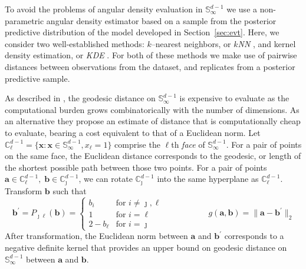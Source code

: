 To avoid the problems of angular density evaluation in $\mathbb{S}_\infty^{d-1}$ we use a 
    non-parametric angular density estimator based on a sample from the 
    posterior predictive distribution of the model developed in 
    Section~\ref{sec:evt}. Here, we consider two well-established
    methods: $k$--nearest neighbors, or \emph{$k$NN} \citep{mack1979}, and 
    kernel density estimation, or \emph{KDE} \citep{parzen1962}.  For both of 
    these methods we make use of pairwise distances between observations 
    from the dataset, and replicates from a posterior predictive sample.  

As described in \cite{trubey:pg}, the  geodesic distance on 
    $\mathbb{S}_{\infty}^{d-1}$ 
    is expensive to evaluate as the computational burden grows 
    combinatorically with the number of dimensions.  As an alternative they propose an 
    estimate of distance that is computationally cheap to evaluate, bearing 
    a cost equivalent to that of a Euclidean norm.
    Let
    ${\mathbb C}_{\ell}^{d-1} = \lbrace \bm{x} : 
        \bm{x} \in {\mathbb S}_{\infty}^{d-1}, x_{\ell} = 1\rbrace$
    comprise the $\ell$th \emph{face} of $\mathbb{S}_{\infty}^{d-1}$.  For a 
    pair of points on the same face, the Euclidean distance corresponds to the
    geodesic, or length of the shortest possible path between those two points.  
    For a pair of points 
    $\bm{a} \in \mathbb{C}_{\ell}^{d-1},\;\bm{b}\in\mathbb{C}_{\jmath}^{d-1}$,
    we can rotate $\mathbb{C}_{\jmath}^{d-1}$ into the same hyperplane as 
    $\mathbb{C}_{\ell}^{d-1}$.  Transform $\bm{b}$ such that %
    \begin{equation}
        \label{eqn:rotation}
        \bm{b}^{\prime} = P_{\jmath\ell}(\bm{b}) = 
        \begin{cases}
            b_{i} &\text{for }i\neq \jmath,\ell\\
            1 &\text{for }i = \ell\\
            2 - b_{\ell} &\text{for }i = \jmath
        \end{cases}\;\hspace{2cm}\;
        g(\bm{a},\bm{b}) = \lVert \bm{a} - \bm{b}^{\prime}\rVert_2
    \end{equation}
    After transformation, the Euclidean norm between $\bm{a}$ and 
    $\bm{b}^{\prime}$ corresponds to a negative definite kernel that
    provides an upper bound on geodesic distance on 
    $\mathbb{S}_{\infty}^{d-1}$ between $\bm{a}$ and $\bm{b}$.

